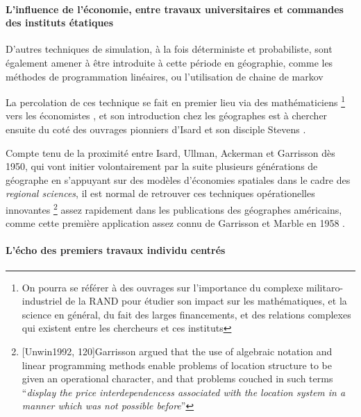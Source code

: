 {\paragraph{L'influence de l'économie, entre travaux universitaires et commandes des instituts étatiques}

D'autres techniques de simulation, à la fois déterministe et probabiliste, sont également amener à être introduite à cette période en géographie, comme les méthodes de programmation linéaires, ou l'utilisation de chaine de markov \autocite{Marble1964} \autocite{Clark1965} 

La percolation de ces technique se fait en premier lieu via des mathématiciens \footnote{On pourra se référer à des ouvrages sur l'importance du complexe militaro-industriel de la RAND pour étudier son impact sur les mathématiques, et la science en général, du fait des larges financements, et des relations complexes qui existent entre les chercheurs et ces instituts} vers les économistes \autocite{Samuelson1952}, et son introduction chez les géographes est à chercher ensuite du coté des ouvrages pionniers d'Isard \autocite{Isard1956} \autocite{Isard1958} et son disciple Stevens \autocite{Stevens1958}.

Compte tenu de la proximité entre Isard, Ullman, Ackerman et Garrisson \autocite{Barnes2004} dès 1950, qui vont initier volontairement \autocite[120]{Unwin1992} par la suite plusieurs générations de géographe en s'appuyant sur des modèles d'économies spatiales dans le cadre des \textit{regional sciences}, il est normal de retrouver ces techniques opérationelles innovantes \footnote{ [Unwin1992, 120]{Garrisson argued that the use of algebraic notation and linear programming methods enable problems of location structure to be given an operational character, and that problems couched in such terms \enquote{\textit{display the price interdependencess associated with the location system in a manner which was not possible before}}}} assez rapidement dans les publications des géographes américains, comme cette première application assez connu de Garrisson et Marble en 1958 \autocite{Garrison1958}.


\paragraph{L'écho des premiers travaux individu centrés}

}
